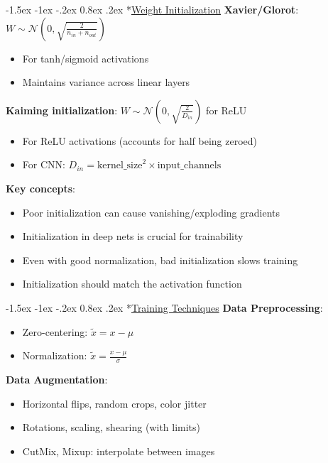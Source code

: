 \documentclass{article}
\makeatletter
\renewcommand\section{\@startsection{section}{1}{\z@}%
                                  {-1.5ex \@plus -1ex \@minus -.2ex}%
                                  {0.8ex \@plus.2ex}%
                                  {\normalfont\small\bfseries}}
\makeatother
\begin{document}
\begin{multicols}{3}
\section*{\underline{Weight Initialization}}
\textbf{Xavier/Glorot}: $W \sim \mathcal{N}(0, \sqrt{\frac{2}{n_{in} + n_{out}}})$
\begin{itemize}
\item For tanh/sigmoid activations
\item Maintains variance across linear layers
\end{itemize}

\textbf{Kaiming initialization}: $W \sim \mathcal{N}(0, \sqrt{\frac{2}{D_{in}}})$ for ReLU
\begin{itemize}
\item For ReLU activations (accounts for half being zeroed)
\item For CNN: $D_{in} = \text{kernel\_size}^2 \times \text{input\_channels}$
\end{itemize}

\textbf{Key concepts}:
\begin{itemize}
\item Poor initialization can cause vanishing/exploding gradients
\item Initialization in deep nets is crucial for trainability
\item Even with good normalization, bad initialization slows training
\item Initialization should match the activation function
\end{itemize}

\section*{\underline{Training Techniques}}
\textbf{Data Preprocessing}:
\begin{itemize}
\item Zero-centering: $\tilde{x} = x - \mu$
\item Normalization: $\tilde{x} = \frac{x - \mu}{\sigma}$
\end{itemize}

\textbf{Data Augmentation}:
\begin{itemize}
\item Horizontal flips, random crops, color jitter
\item Rotations, scaling, shearing (with limits)
\item CutMix, Mixup: interpolate between images
\end{itemize}


\end{multicols}
\end{document}
